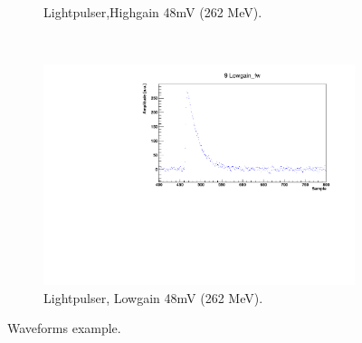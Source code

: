 \documentclass[12pt,a4paper, twocolumn]{article}
\begin{document}
\begin{figure} [htb]
\begin{subfigure}[b]{0.5\linewidth}
\caption{Lightpulser,Highgain 48mV (262 MeV).}
\label{fig:sadc:48mV_High}
\end{subfigure}
\\
\begin{subfigure}[b]{0.5\linewidth}
\includegraphics[width=\linewidth]{fig/Lowgain815.pdf}
\caption{Lightpulser, Lowgain 48mV (262 MeV).}
\label{fig:sadc:48mV_Low}
\end{subfigure}
\caption{Waveforms example.}
\label{fig:sadc:example}
\end{figure}
\end{document}
